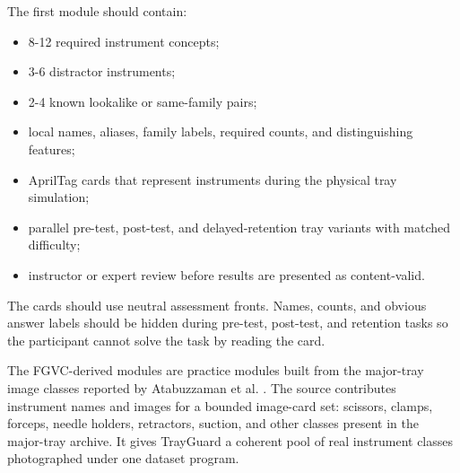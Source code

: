 \documentclass[10pt,a4paper]{article}
\begin{document}
The first module should contain:
\begin{itemize}
  \item 8-12 required instrument concepts;
  \item 3-6 distractor instruments;
  \item 2-4 known lookalike or same-family pairs;
  \item local names, aliases, family labels, required counts, and distinguishing features;
  \item AprilTag cards that represent instruments during the physical tray simulation;
  \item parallel pre-test, post-test, and delayed-retention tray variants with matched difficulty;
  \item instructor or expert review before results are presented as content-valid.
\end{itemize}
The cards should use neutral assessment fronts. Names, counts, and obvious
answer labels should be hidden during pre-test, post-test, and retention tasks
so the participant cannot solve the task by reading the card.

The FGVC-derived modules are practice modules built from the major-tray image
classes reported by Atabuzzaman et al. \cite{atabuzzaman-et-al-2025}. The
source contributes instrument names and images for a bounded image-card set:
scissors, clamps, forceps, needle holders, retractors, suction, and other
classes present in the major-tray archive. It gives TrayGuard a coherent pool of
real instrument classes photographed under one dataset program.
\end{document}
